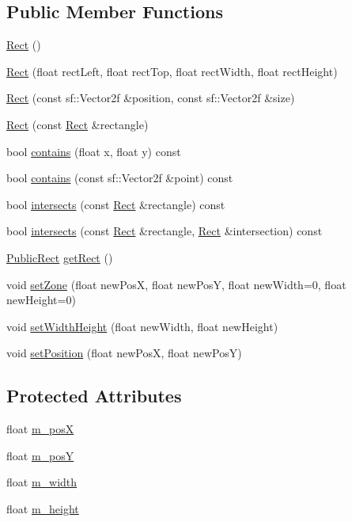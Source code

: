 \subsection*{Public Member Functions}
\begin{DoxyCompactItemize}
\item 
\hyperlink{class_rect_a911e531b86de33734dd7de3456722115}{Rect} ()
\item 
\hyperlink{class_rect_ac039884b92bbdee68f7162036dfaefde}{Rect} (float rect\-Left, float rect\-Top, float rect\-Width, float rect\-Height)
\item 
\hyperlink{class_rect_aba3faa70ac657c788232b35719634196}{Rect} (const sf\-::\-Vector2f \&position, const sf\-::\-Vector2f \&size)
\item 
\hyperlink{class_rect_ac27e3c442eca764a0adbfbce7ecd679b}{Rect} (const \hyperlink{class_rect}{Rect} \&rectangle)
\item 
bool \hyperlink{class_rect_a4d0518ea473db46452c25044a95427ad}{contains} (float x, float y) const 
\item 
bool \hyperlink{class_rect_a98fe180ce28319ff319de5ab97fcc14c}{contains} (const sf\-::\-Vector2f \&point) const 
\item 
bool \hyperlink{class_rect_a77ef59c0903b538039bfeb3f4f03e198}{intersects} (const \hyperlink{class_rect}{Rect} \&rectangle) const 
\item 
bool \hyperlink{class_rect_a494a972edd829cb586333dfdd9c50b0a}{intersects} (const \hyperlink{class_rect}{Rect} \&rectangle, \hyperlink{class_rect}{Rect} \&intersection) const 
\item 
\hyperlink{class_public_rect}{Public\-Rect} \hyperlink{class_rect_a13d9cb2506258eda3787905452a9e7a3}{get\-Rect} ()
\item 
void \hyperlink{class_rect_a9c289437abe60bbb455c1b494a15eac3}{set\-Zone} (float new\-Pos\-X, float new\-Pos\-Y, float new\-Width=0, float new\-Height=0)
\item 
void \hyperlink{class_rect_ae4da133b058b25385e616496a0d35cc4}{set\-Width\-Height} (float new\-Width, float new\-Height)
\item 
void \hyperlink{class_rect_a7e6fca19d0ce00e318775d37631e2e0d}{set\-Position} (float new\-Pos\-X, float new\-Pos\-Y)
\end{DoxyCompactItemize}
\subsection*{Protected Attributes}
\begin{DoxyCompactItemize}
\item 
float \hyperlink{class_rect_aee32c031336a50f77c6cf882053e89f9}{m\-\_\-pos\-X}
\item 
float \hyperlink{class_rect_a10680ccabe0068eda6c9637aa6eeb2fd}{m\-\_\-pos\-Y}
\item 
float \hyperlink{class_rect_a2c4d58cb6e4d113e486913f62f47b558}{m\-\_\-width}
\item 
float \hyperlink{class_rect_a1cec6187b299195fd06daef55e6a96f1}{m\-\_\-height}
\end{DoxyCompactItemize}


